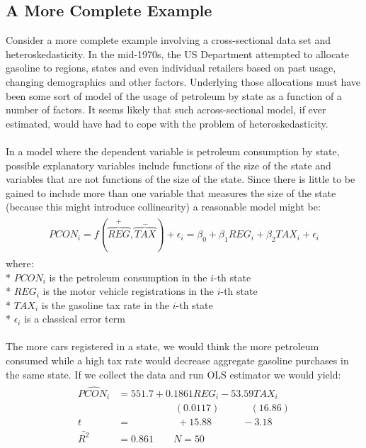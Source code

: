 \documentclass[11pt]{article}
\begin{document}
\subsection{A More Complete Example}
Consider a more complete example involving a cross-sectional data set and heteroskedasticity. In the mid-1970s, the US Department attempted to allocate gasoline to regions, states and even individual retailers based on past usage, changing demographics and other factors. Underlying those allocations must have been some sort of model of the usage of petroleum by state as a function of a number of factors. It seems likely that such across-sectional model, if ever estimated, would have had to cope with the problem of heteroskedasticity.\\ \\
In a model where the dependent variable is petroleum consumption by state, possible explanatory variables include functions of the size of the state and variables that are not functions of the size of the state. Since there is little to be gained to include more than one variable that measures the size of the state (because this might introduce collinearity) a reasonable model might be:
\begin{align}
\label{eg10_20}
\begin{split}
PCON_i = f(\overbrace{REG}^+, \overbrace{TAX}^-) + \epsilon_i = \beta_0 + \beta_1REG_i + \beta_2TAX_i + \epsilon_i
\end{split}
\end{align}
where:\\*
$PCON_i$ is the petroleum consumption in the $i$-th state\\*
$REG_i$ is the motor vehicle registrations in the $i$-th state\\*
$TAX_i$ is the gasoline tax rate in the $i$-th state\\*
$\epsilon_i$ is a classical error term\\\\
The more cars registered in a state, we would think the more petroleum consumed while a high tax rate would decrease aggregate gasoline purchases in the same state. If we collect the data and run OLS estimator we would yield:
\begin{align}
\label{eg10_21}
\begin{split}
\widehat{PCON_i} &= 551.7 + {0.1861REG_i} - {53.59TAX_i}\\
&\>\>\>\>\>\>\>\>\>\>\>\>\>\>\>\>\>\>\>\>\>\>\>\>\>\> (0.0117) 
\>\>\>\>\>\>\>\>\>\>\>\>\>\> (16.86)\\
t&=\>\>\>\>\>\>\>\>\>\>\>\>\>\>\>\>\>\>\>\>\> +15.88 
\>\>\>\>\>\>\>\>\>\>\>\>\>\> -3.18\\
\bar{R^2}&= 0.861 \quad\quad N=50
\end{split}
\end{align}
\end{document}
